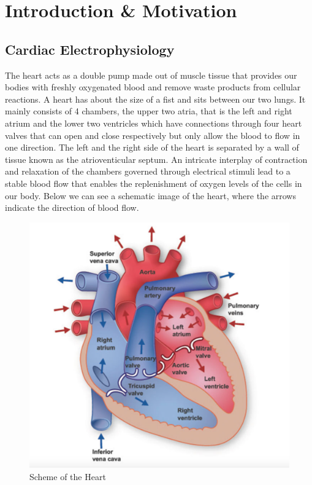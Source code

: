 \documentclass[fleqn, a4paper, 11pt, bibliography=totoc]{report}
\begin{document}
	
\chapter{Introduction \& Motivation}

\section{Cardiac Electrophysiology}

The heart acts as a double pump made out of muscle tissue that provides our bodies with freshly oxygenated blood and remove waste products from cellular reactions. A heart has about the size of a fist and sits between our two lungs. It mainly consists of 4 chambers, the upper two atria, that is the left and right atrium and the lower two ventricles which have connections through four heart valves that can open and close respectively but only allow the blood to flow in one direction. The left and the right side of the heart is separated by a wall of tissue known as the atrioventicular septum. An intricate interplay of contraction and relaxation of the chambers governed through electrical stimuli lead to a stable blood flow that enables the replenishment of oxygen levels of the cells in our body. Below we can see a schematic image of the heart, where the arrows indicate the direction of blood flow.

\begin{figure}[ht!]
	\centering
	\includegraphics[scale=0.3]{images/heart_structure_2}
	\caption{Scheme of the Heart \cite{franzone2014mathematical}}
\end{figure}
\end{document}
